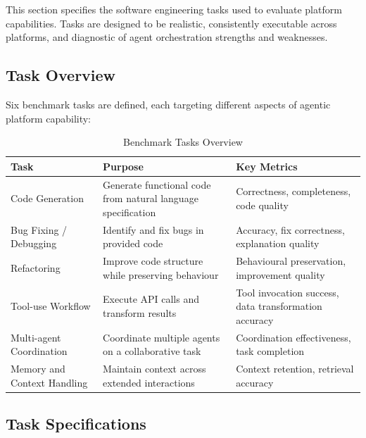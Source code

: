 \documentclass[]
{UCD_CS_FYP_Report}
\begin{document}
This section specifies the software engineering tasks used to evaluate platform capabilities. Tasks are designed to be realistic, consistently executable across platforms, and diagnostic of agent orchestration strengths and weaknesses.

\subsection{Task Overview}

Six benchmark tasks are defined, each targeting different aspects of agentic platform capability:

\begin{table}[H]
  \centering
  \begin{tabular}{|l|p{4cm}|p{5cm}|}
    \hline
    \textbf{Task}               & \textbf{Purpose}                                             & \textbf{Key Metrics}                                  \\
    \hline
    Code Generation             & Generate functional code from natural language specification & Correctness, completeness, code quality               \\
    \hline
    Bug Fixing / Debugging      & Identify and fix bugs in provided code                       & Accuracy, fix correctness, explanation quality        \\
    \hline
    Refactoring                 & Improve code structure while preserving behaviour            & Behavioural preservation, improvement quality         \\
    \hline
    Tool-use Workflow           & Execute API calls and transform results                      & Tool invocation success, data transformation accuracy \\
    \hline
    Multi-agent Coordination    & Coordinate multiple agents on a collaborative task           & Coordination effectiveness, task completion           \\
    \hline
    Memory and Context Handling & Maintain context across extended interactions                & Context retention, retrieval accuracy                 \\
    \hline
  \end{tabular}
  \caption{Benchmark Tasks Overview}
\end{table}

\subsection{Task Specifications}
\end{document}
